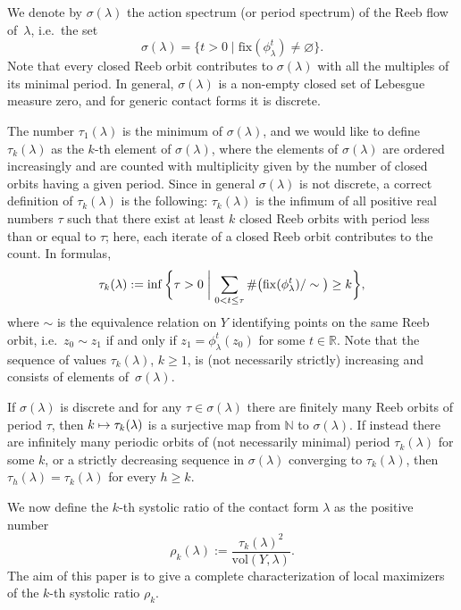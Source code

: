 \documentclass[10pt,a4paper]{amsart}
\providecommand{\ie}{i.e.\ }
\let\mathds\mathbb
\newcommand\mto{\mathchoice{\longmapsto}{\mapsto}{\mapsto}{\mapsto}}
\theoremstyle{definition}
\newcommand{\vol}{\mathrm{vol}}
\newcommand{\fix}{\mathrm{fix}}
\newcommand{\N}{\mathds{N}}
\newcommand{\R}{\mathds{R}}
\providecommand{\ie}{i.e. }
\begin{document}
We denote by $\sigma(\lambda)$ the action spectrum (or period spectrum) of the Reeb flow of~$\lambda$, \ie the set
\[
\sigma(\lambda)=\big\{t>0\mid \fix(\phi_\lambda^t)\neq\varnothing\big\}.
\]
Note that every closed Reeb orbit contributes to $\sigma(\lambda)$ with all the multiples of its minimal period. In general, $\sigma(\lambda)$ is a non-empty closed set of Lebesgue measure zero, and for generic contact forms it is discrete.

The number $\tau_1(\lambda)$ is the minimum of $\sigma(\lambda)$, and we would like to define $\tau_k(\lambda)$ as the $k$-th element of $\sigma(\lambda)$, where the elements of $\sigma(\lambda)$ are ordered increasingly and are counted with multiplicity given by the number of closed orbits having a given period. Since in general $\sigma(\lambda)$ is not discrete, a correct definition of $\tau_k(\lambda)$ is the following: $\tau_k(\lambda)$ is the infimum of all positive real numbers $\tau$ such that there exist at least $k$ closed Reeb orbits with period less than or equal to $\tau$; here, each iterate of a closed Reeb orbit contributes to the count. In formulas,
\begin{equation}
\label{e:tau_k}
\tau_k(\lambda):=\inf\bigg\{\tau>0 \biggm| \sum_{0<t\leq\tau} \#\big(\fix(\phi_\lambda^t)/\sim\big)\geq k \bigg\},
\end{equation}
where $\sim$ is the equivalence relation on $Y$ identifying points on the same Reeb orbit, \ie $z_0\sim z_1$ if and only if $z_1=\phi_\lambda^t(z_0)$ for some $t\in\R$. Note that the sequence of values $\tau_k(\lambda)$, $k\geq1$, is (not necessarily strictly) increasing and consists of elements of~$\sigma(\lambda)$.

If $\sigma(\lambda)$ is discrete and for any $\tau \in \sigma(\lambda)$ there are finitely many Reeb orbits of period $\tau$, then $k\mto \tau_k(\lambda)$ is a surjective map from $\N$ to $\sigma(\lambda)$. If instead there are infinitely many periodic orbits of (not necessarily minimal) period $\tau_{k}(\lambda)$ for some $k$, or a strictly decreasing sequence in $\sigma(\lambda)$ converging to $\tau_{k}(\lambda)$, then $\tau_h(\lambda)=\tau_{k}(\lambda)$ for every $h\geq k$.

We now define the $k$-th systolic ratio of the contact form $\lambda$ as the positive number
\[
\rho_k(\lambda) := \frac{\tau_k(\lambda)^2}{\vol(Y,\lambda)}.
\]
The aim of this paper is to give a complete characterization of local maximizers of the $k$-th systolic ratio $\rho_k$.
\end{document}
